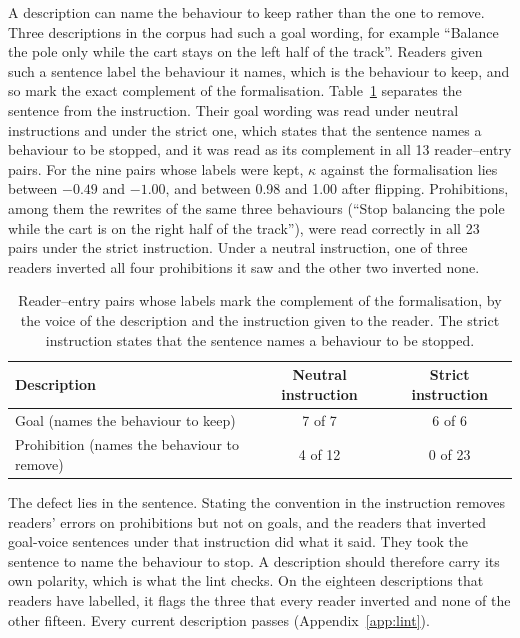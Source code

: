 \documentclass{article}
\begin{document}
A description can name the behaviour to keep rather than the one to
remove. Three descriptions in the corpus had such a goal wording, for
example ``Balance the pole only while the cart stays on the left half of
the track''. Readers given such a sentence label the
behaviour it names, which is the behaviour to keep, and so mark the exact
complement of the formalisation. Table~\ref{tab:polarity} separates the
sentence from the instruction. Their goal wording was read under
neutral instructions and under the strict one,
which states that the sentence names a behaviour to be stopped, and it
was read as its complement in all 13 reader--entry pairs. For the nine
pairs whose labels were kept, $\kappa$ against the formalisation lies
between $-0.49$ and $-1.00$, and between 0.98 and 1.00 after flipping.
Prohibitions, among them the rewrites of the same three behaviours
(``Stop balancing the pole while the cart is on the right half of the
track''), were read correctly in all 23 pairs under the strict
instruction. Under a neutral instruction, one of three readers inverted
all four prohibitions it saw and the other two inverted none.

\begin{table}[t]
\centering
\caption{Reader--entry pairs whose labels mark the complement of the
formalisation, by the voice of the description and the instruction given
to the reader. The strict instruction states that the sentence names a
behaviour to be stopped.}
\label{tab:polarity}
\begin{tabular}{@{}lcc@{}}
\toprule
Description & Neutral instruction & Strict instruction \\
\midrule
Goal (names the behaviour to keep) & 7 of 7 & 6 of 6 \\
Prohibition (names the behaviour to remove) & 4 of 12 & 0 of 23 \\
\bottomrule
\end{tabular}
\end{table}

The defect lies in the sentence. Stating the convention in the
instruction removes readers' errors on prohibitions but not on goals, and
the readers that inverted goal-voice sentences under that instruction did
what it said. They took the sentence to name the behaviour to stop. A
description should therefore carry its own polarity, which is what the
lint checks. On the eighteen descriptions that readers have labelled, it
flags the three that every reader inverted and none of the other fifteen.
Every current description passes (Appendix~\ref{app:lint}).
\end{document}
